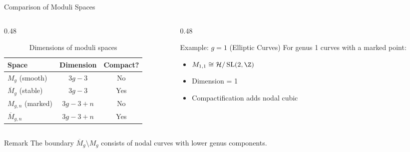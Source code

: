 \begin{frame}{Comparison of Moduli Spaces}
  \begin{columns}[T]
    \begin{column}{0.48\textwidth}
      \begin{table}
        \centering
        \begin{tabular}{lcc}
          \toprule
          \textbf{Space} & \textbf{Dimension} & \textbf{Compact?} \\
          \midrule
          $M_g$ (smooth) & $3g-3$ & No \\
          $\overline{M}_g$ (stable) & $3g-3$ & Yes \\
          $M_{g,n}$ (marked) & $3g-3+n$ & No \\
          $\overline{M}_{g,n}$ & $3g-3+n$ & Yes \\
          \bottomrule
        \end{tabular}
        \caption{Dimensions of moduli spaces}
      \end{table}
    \end{column}
    
    \begin{column}{0.48\textwidth}
      \begin{exampleblock}{Example: $g=1$ (Elliptic Curves)}
        For genus 1 curves with a marked point:
        \begin{itemize}
          \item $M_{1,1} \cong \mathcal{H}/\operatorname{SL}(2,\Z)$
          \item Dimension = 1
          \item Compactification adds nodal cubic
        \end{itemize}
      \end{exampleblock}
    \end{column}
  \end{columns}
  
  \vspace{1em}
  \begin{block}{Remark}
    The boundary $\overline{M}_g \setminus M_g$ consists of nodal curves with lower genus components.
  \end{block}
\end{frame}